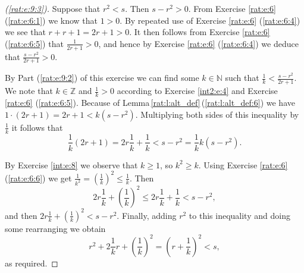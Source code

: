 \begin{proof}[(\ref{rat:e:9:3})]
	Suppose that $r^2 < s$. Then $s - r^2 > 0$. From Exercise \ref{rat:e:6} (\ref{rat:e:6:1}) we know that $1 > 0$. By repeated use of Exercise \ref{rat:e:6} (\ref{rat:e:6:4}) we see that $r + r + 1 = 2r + 1 > 0$. It then follows from Exercise \ref{rat:e:6} (\ref{rat:e:6:5}) that $\frac{1}{2r + 1} > 0$, and hence by Exercise \ref{rat:e:6} (\ref{rat:e:6:4}) we deduce that $\frac{s - r^2}{2r + 1} > 0$.

	By Part (\ref{rat:e:9:2}) of this exercise we can find some $k \in \mathbb{N}$ such that $\frac{1}{k} < \frac{s - r^2}{2r + 1}$. We note that $k \in \mathbb{Z}$ and $\frac{1}{k} > 0$ according to Exercise \ref{int2:e:4} and Exercise \ref{rat:e:6} (\ref{rat:e:6:5}). Because of Lemma\,\ref{rat:l:alt_def}\,(\ref{rat:l:alt_def:6}) we have $1 \cdot (2r + 1) = 2r + 1 < k(s - r^2)$. Multiplying both sides of this inequality by $\frac{1}{k}$ it follows that
	\[
		\frac{1}{k}(2r + 1) = 2r \frac{1}{k} + \frac{1}{k} < s - r^2 = \frac{1}{k} k (s - r^2).
	\]

	By Exercise \ref{int:e:8} we observe that $k \geq 1$, so $k^2 \geq k$. Using Exercise \ref{rat:e:6} (\ref{rat:e:6:6}) we get $\frac{1}{k^2} = \left( \frac{1}{k} \right)^2 \leq \frac{1}{k}$. Then
	\[
		2r \frac{1}{k} + \left( \frac{1}{k} \right)^2 \leq 2r \frac{1}{k} + \frac{1}{k} < s - r^2,
	\]
	and then $2r \frac{1}{k} + \left( \frac{1}{k} \right)^2 < s - r^2$. Finally, adding $r^2$ to this inequality and doing some rearranging we obtain
	\[
		r^2 + 2 \frac{1}{k} r + \left( \frac{1}{k} \right)^2 = \left( r + \frac{1}{k} \right)^2 < s,
	\]
	as required.
\end{proof}